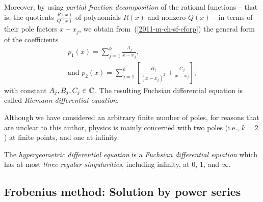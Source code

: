 Moreover, by using
{\em partial fraction decomposition}
of the rational functions
-- that is, the quotients $\frac{R(x)}{Q(x)}$ of polynomials $R(x)$
and nonzero $Q(x)$ --
in terms of their pole factors $x-x_j$,
we obtain from~(\ref{2011-m-ch-sf-eforp}) the general form of the coefficients
\begin{equation}
\begin{split}
p_1 (x)  = \sum_{j=1}^k \frac{A_j}{x-x_j},\\
\textrm{and }
p_2(x) = \sum_{j=1}^k \left[ \frac{B_j}{(x-x_j)^2}   +  \frac{C_j}{x-x_j} \right]
,
\end{split}
\label{2012-m-ch-sf-eforp12359}
\end{equation}
with constant $A_j, B_j, C_j \in {\Bbb C}$.
The resulting Fuchsian differential equation
is called
{\em Riemann differential equation}.



Although we have considered an arbitrary finite number of poles,
for reasons that are unclear to this author,
physics is mainly concerned
with two poles (i.e., $k=2$)
at finite points, and one at infinity.

The {\em hypergeometric differential equation} is a {\em Fuchsian differential equation}
which has at most {\em three regular singularities}, including infinity,
at\cite{Kuznetsov}  $0$, $1$, and $\infty$.

\subsection{Frobenius method: Solution by power series}

